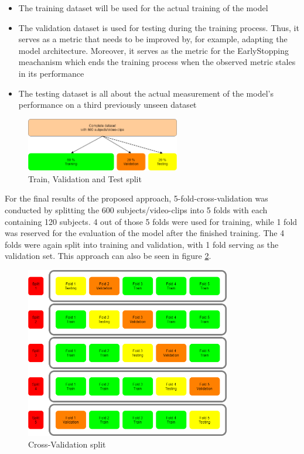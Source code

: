 \begin{itemize}
    \item The training dataset will be used for the actual training of the model
    \item The validation dataset is used for testing during the training process. Thus, it serves as a metric that needs to be improved by, for example, adapting the model architecture. Moreover, it serves as the metric for the EarlyStopping meachanism which ends the training process when the observed metric stales in its performance
    \item The testing dataset is all about the actual measurement of the model's performance on a third previously unseen dataset
\end{itemize}

\begin{figure}[H]
  \begin{center}
  \includegraphics[angle=0, width=0.6\textwidth]{Figures/TrainTest_Split.png}
  \caption{Train, Validation and Test split}
  \label{fig:TrainTestSplit}
  \end{center}
\end{figure}

For the final results of the proposed approach, 5-fold-cross-validation was conducted by splitting the 600 subjects/video-clips into 5 folds with each containing 120 subjects. 4 out of those 5 folds were used for training, while 1 fold was reserved for the evaluation of the model after the finished training. The 4 folds were again split into training and validation, with 1 fold serving as the validation set. This approach can also be seen in figure \ref{fig:CrossValidationSplit}.

\begin{figure}[H]
  \begin{center}
  \includegraphics[angle=0, width=0.8\textwidth]{Figures/CrossValidation_Split.png}
  \caption{Cross-Validation split}
  \label{fig:CrossValidationSplit}
  \end{center}
\end{figure}


